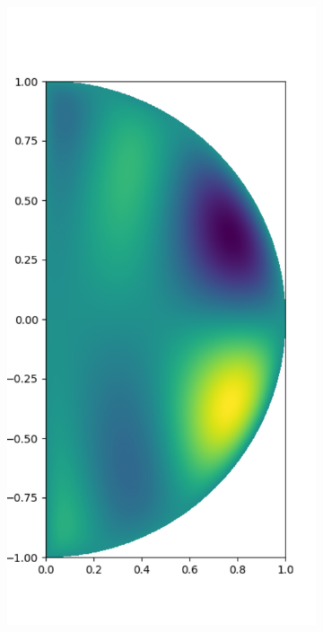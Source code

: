 \documentclass[11pt, oneside]{article}   	%
\begin{document}
\begin{figure}[t]
	\begin{subfigure}{0.3\textwidth}
	\centering
	\includegraphics[scale=0.3]{solution-helmholtz-k=100}
	\end{subfigure}

\end{figure}
\end{document}
